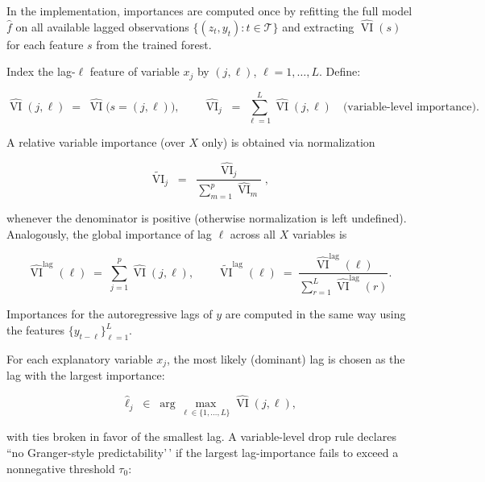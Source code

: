 \documentclass[preprint, 3p,
authoryear]{elsarticle} %
\begin{document}
In the implementation, importances are computed once by refitting the
full model \(\widehat f\) on all available lagged observations
\(\{(z_t,y_t): t\in\mathcal{T}\}\) and extracting
\(\widehat{\operatorname{VI}}(s)\) for each feature \(s\) from the
trained forest.

Index the lag-\(\ell\) feature of variable \(x_j\) by \((j,\ell)\),
\(\ell=1,\dots,L\). Define:

\begin{equation}
\widehat{\operatorname{VI}}(j,\ell) \;=\; \widehat{\operatorname{VI}}\big(s=(j,\ell)\big), 
\qquad
\widehat{\operatorname{VI}}_j \;=\; \sum_{\ell=1}^L \widehat{\operatorname{VI}}(j,\ell)
\quad\text{(variable-level importance)}.
\end{equation}

A relative variable importance (over \(X\) only) is obtained via
normalization

\begin{equation}
\widetilde{\operatorname{VI}}_j
\;=\;
\frac{\widehat{\operatorname{VI}}_j}{\sum_{m=1}^p \widehat{\operatorname{VI}}_m},
\end{equation}

\noindent whenever the denominator is positive (otherwise normalization
is left undefined). Analogously, the global importance of lag \(\ell\)
across all \(X\) variables is

\begin{equation}
\widehat{\operatorname{VI}}^{\text{lag}}(\ell)
\;=\;
\sum_{j=1}^p \widehat{\operatorname{VI}}(j,\ell),
\qquad
\widetilde{\operatorname{VI}}^{\text{lag}}(\ell)
\;=\;
\frac{\widehat{\operatorname{VI}}^{\text{lag}}(\ell)}
{\sum_{r=1}^L \widehat{\operatorname{VI}}^{\text{lag}}(r)}.
\end{equation}

Importances for the autoregressive lags of \(y\) are computed in the
same way using the features \(\{y_{t-\ell}\}_{\ell=1}^L\).

For each explanatory variable \(x_j\), the most likely (dominant) lag is
chosen as the lag with the largest importance:

\begin{equation}
\widehat{\ell}_j \;\in\; \arg\max_{\ell\in\{1,\dots,L\}} \widehat{\operatorname{VI}}(j,\ell),
\end{equation}

with ties broken in favor of the smallest lag. A variable-level drop
rule declares ``no Granger-style predictability'\,' if the largest
lag-importance fails to exceed a nonnegative threshold \(\tau_0\):
\end{document}
